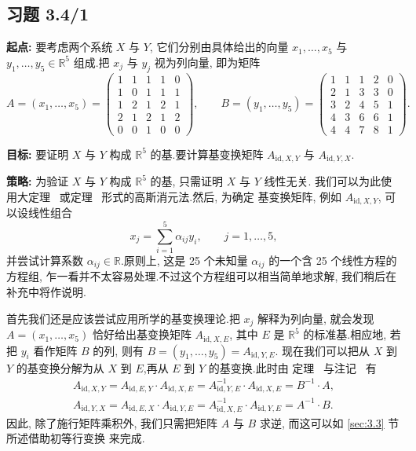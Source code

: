 \subsection*{习题 3.4/1}

\noindent\textbf{起点:} 要考虑两个系统 $X$ 与 $Y$, 它们分别由具体给出的向量
$x_1, \ldots, x_5$ 与 $y_1, \ldots, y_5 \in \mathbb{R}^5$ 组成.把 $x_j$ 与 $y_j$ 视为列向量,
即为矩阵
\[
A = (x_1, \ldots, x_5) = \begin{pmatrix} 1 & 1 & 1 & 1 & 0 \\ 1 & 0 & 1 & 1 & 1 \\ 1 & 2 & 1 & 2 & 1 \\ 2 & 1 & 2 & 1 & 2 \\ 0 & 0 & 1 & 0 & 0 \end{pmatrix},
\qquad
B = (y_1, \ldots, y_5) = \begin{pmatrix} 1 & 1 & 1 & 2 & 0 \\ 2 & 1 & 3 & 3 & 0 \\ 3 & 2 & 4 & 5 & 1 \\ 4 & 3 & 6 & 6 & 1 \\ 4 & 4 & 7 & 8 & 1 \end{pmatrix}\text{.}
\]

\noindent\textbf{目标:} 要证明 $X$ 与 $Y$ 构成 $\mathbb{R}^5$ 的基.要计算基变换矩阵
$A_{\mathrm{id}, X, Y}$ 与 $A_{\mathrm{id}, Y, X}$.

\noindent\textbf{策略:} 为验证 $X$ 与 $Y$ 构成 $\mathbb{R}^5$ 的基, 只需证明 $X$ 与 $Y$ 线性无关.
我们可以为此使用大定理~ 或定理~ 形式的高斯消元法.然后, 为确定
基变换矩阵, 例如 $A_{\mathrm{id}, X, Y}$, 可以设线性组合
\[
x_j = \sum_{i = 1}^{5} \alpha_{ij} y_i, \qquad j = 1, \ldots, 5,
\]
并尝试计算系数 $\alpha_{ij} \in \mathbb{R}$.原则上, 这是 25 个未知量 $\alpha_{ij}$ 的一个含
25 个线性方程的方程组, 乍一看并不太容易处理.不过这个方程组可以相当简单地求解, 我们稍后在
补充中将作说明.

首先我们还是应该尝试应用所学的基变换理论.把 $x_j$ 解释为列向量, 就会发现
$A = (x_1, \ldots, x_5)$ 恰好给出基变换矩阵 $A_{\mathrm{id}, X, E}$, 其中 $E$ 是 $\mathbb{R}^5$
的标准基.相应地, 若把 $y_i$ 看作矩阵 $B$ 的列, 则有 $B = (y_1, \ldots, y_5) = A_{\mathrm{id}, Y, E}$.
现在我们可以把从 $X$ 到 $Y$ 的基变换分解为从 $X$ 到 $E$,再从 $E$ 到 $Y$ 的基变换.此时由
定理~ 与注记~ 有
\[
\begin{array}{l}
A_{\mathrm{id}, X, Y} = A_{\mathrm{id}, E, Y} \cdot A_{\mathrm{id}, X, E} = A_{\mathrm{id}, Y, E}^{-1} \cdot A_{\mathrm{id}, X, E} = B^{-1} \cdot A, \\
A_{\mathrm{id}, Y, X} = A_{\mathrm{id}, E, X} \cdot A_{\mathrm{id}, Y, E} = A_{\mathrm{id}, X, E}^{-1} \cdot A_{\mathrm{id}, Y, E} = A^{-1} \cdot B.
\end{array}
\]
因此, 除了施行矩阵乘积外, 我们只需把矩阵 $A$ 与 $B$ 求逆, 而这可以如 \ref{sec:3.3} 节所述借助初等行变换
来完成.


